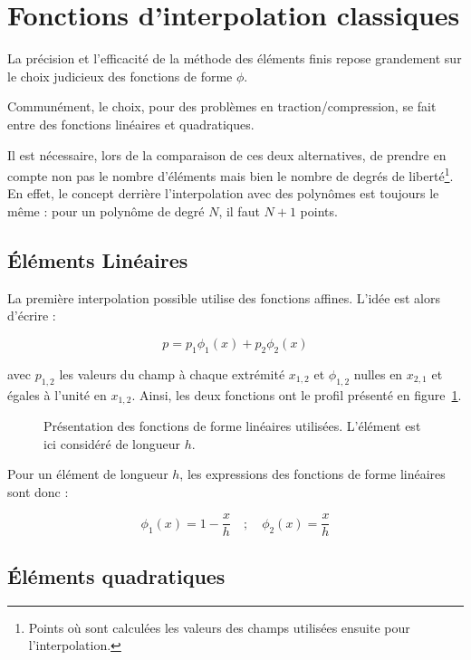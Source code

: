 \section{Fonctions d'interpolation classiques}

La précision et l'efficacité de la méthode des éléments finis repose grandement sur le choix judicieux des fonctions de
forme $\phi$.

Communément, le choix, pour des problèmes en traction/compression, se fait entre des fonctions linéaires et
quadratiques.

Il est nécessaire, lors de la comparaison de ces deux alternatives, de prendre en compte non pas le nombre d'éléments
mais bien le nombre de degrés de liberté\footnote{Points où sont calculées les valeurs des champs utilisées ensuite pour
l'interpolation.}. En effet, le concept derrière l'interpolation avec des polynômes est toujours le même : pour un
polynôme de degré $N$, il faut $N+1$ points.

\subsection{Éléments Linéaires}

La première interpolation possible utilise des fonctions affines. L'idée est alors d'écrire :

$$p = p_1\phi_1(x) + p_2\phi_2(x)$$

avec $p_{1,2}$ les valeurs du champ à chaque extrémité $x_{1,2}$ et $\phi_{1,2}$ nulles en $x_{2,1}$ et égales à l'unité
en $x_{1,2}$. Ainsi, les deux fonctions ont le profil présenté en figure~\ref{fig:FEM:lin_shape_fun}.

\begin{figure}[!ht]
	\centering
	
	\caption{\label{fig:FEM:lin_shape_fun}Présentation des fonctions de forme linéaires utilisées. L'élément est ici considéré
	de longueur $h$.}
\end{figure}

Pour un élément de longueur $h$, les expressions des fonctions de forme linéaires sont donc :

\begin{equation*}
	\phi_1(x) = 1-\frac{x}{h} \quad;\quad \phi_2(x) = \frac{x}{h}
\end{equation*}


\subsection{Éléments quadratiques}

